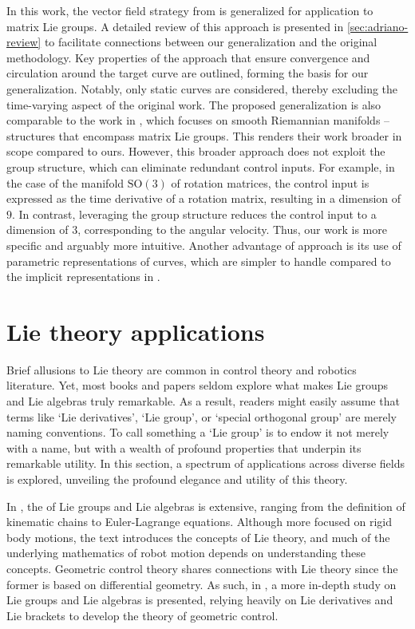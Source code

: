 In this work, the vector field strategy from \citet{Rezende2022} is generalized for application to matrix Lie groups. A detailed review of this approach is presented in \cref{sec:adriano-review} to facilitate connections between our generalization and the original methodology. Key properties of the approach that ensure convergence and circulation around the target curve are outlined, forming the basis for our generalization. Notably, only static curves are considered, thereby excluding the time-varying aspect of the original work. The proposed generalization is also comparable to the work in \citet{yao2022topological}, which focuses on smooth Riemannian manifolds -- structures that encompass matrix Lie groups. This renders their work broader in scope compared to ours. However, this broader approach does not exploit the group structure, which can eliminate redundant control inputs. For example, in the case of the manifold $\text{SO}(3)$ of rotation matrices, the control input is expressed as the time derivative of a rotation matrix, resulting in a dimension of $9$. In contrast, leveraging the group structure reduces the control input to a dimension of $3$, corresponding to the angular velocity. Thus, our work is more specific and arguably more intuitive. Another advantage of  approach is its use of parametric representations of curves, which are simpler to handle compared to the implicit representations in \citet{yao2022topological}.

\section{Lie theory applications} \label{sec:lit-review-lie-theory}
Brief allusions to Lie theory are common in control theory and robotics literature. Yet, most books and papers seldom explore what makes Lie groups and Lie algebras truly remarkable. As a result, readers might easily assume that terms like `Lie derivatives', `Lie group', or `special orthogonal group' are merely naming conventions. To call something a `Lie group' is to endow it not merely with a name, but with a wealth of profound properties that underpin its remarkable utility. In this section, a spectrum of applications across diverse fields is explored, unveiling the profound elegance and utility of this theory.

In \citet{Murray1994}, the  of Lie groups and Lie algebras is extensive, ranging from the definition of kinematic chains to Euler-Lagrange equations. Although more focused on rigid body motions, the text introduces the concepts of Lie theory, and much of the underlying mathematics of robot motion depends on understanding these concepts. Geometric control theory shares connections with Lie theory since the former is based on differential geometry. As such, in \citet{Bullo2004}, a more in-depth study on Lie groups and Lie algebras is presented, relying heavily on Lie derivatives and Lie brackets to develop the theory of geometric control.

